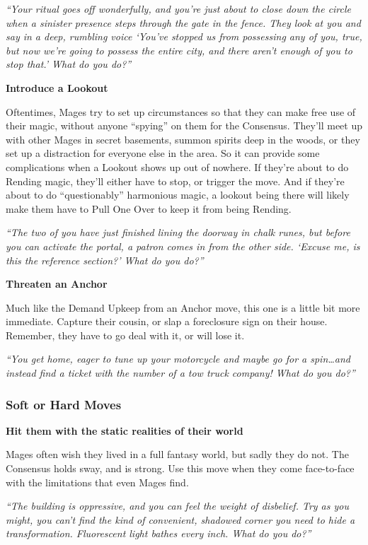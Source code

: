 \documentclass[
]{article}
\begin{document}
\emph{``Your ritual goes off wonderfully, and you're just about to close
down the circle when a sinister presence steps through the gate in the
fence. They look at you and say in a deep, rumbling voice `You've
stopped us from possessing any of you, true, but now we're going to
possess the entire city, and there aren't enough of you to stop that.'
What do you do?''}

\textbf{Introduce a Lookout}

Oftentimes, Mages try to set up circumstances so that they can make free
use of their magic, without anyone ``spying'' on them for the Consensus.
They'll meet up with other Mages in secret basements, summon spirits
deep in the woods, or they set up a distraction for everyone else in the
area. So it can provide some complications when a Lookout shows up out
of nowhere. If they're about to do Rending magic, they'll either have to
stop, or trigger the move. And if they're about to do ``questionably''
harmonious magic, a lookout being there will likely make them have to
Pull One Over to keep it from being Rending.

\emph{``The two of you have just finished lining the doorway in chalk
runes, but before you can activate the portal, a patron comes in from
the other side. `Excuse me, is this the reference section?' What do you
do?''}

\textbf{Threaten an Anchor}

Much like the Demand Upkeep from an Anchor move, this one is a little
bit more immediate. Capture their cousin, or slap a foreclosure sign on
their house. Remember, they have to go deal with it, or will lose it.

\emph{``You get home, eager to tune up your motorcycle and maybe go for
a spin\ldots and instead find a ticket with the number of a tow truck
company! What do you do?''}

\hypertarget{soft-or-hard-moves}{%
\subsubsection{Soft or Hard Moves}\label{soft-or-hard-moves}}

\textbf{Hit them with the static realities of their world}

Mages often wish they lived in a full fantasy world, but sadly they do
not. The Consensus holds sway, and is strong. Use this move when they
come face-to-face with the limitations that even Mages find.

\emph{``The building is oppressive, and you can feel the weight of
disbelief. Try as you might, you can't find the kind of convenient,
shadowed corner you need to hide a transformation. Fluorescent light
bathes every inch. What do you do?''}
\end{document}
